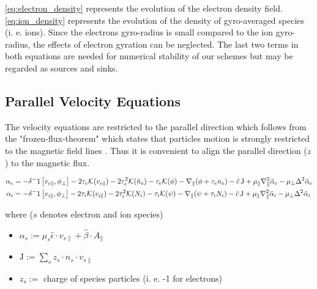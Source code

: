 \newline
\autoref{eq:electron_density} represents the evolution of the electron density field.
\autoref{eq:ion_density} represents the evolution of the density of gyro-averaged species (i. e. ions). Since the electrons gyro-radius is small compared to the ion gyro-radius, the effects of electron gyration can be neglected. \newline
The last two terms in both equations are needed for numerical stability of our schemes but may be regarded as sources and sinks. 


\subsection{Parallel Velocity Equations}
The velocity equations are restricted to the parallel direction which follows from the "frozen-flux-theorem" which states that particles motion is strongly restricted to the magnetic field lines . Thus it is convenient to align the parallel direction ($z$) to the magnetic flux.


\begin{align}
    \alpha_e &=  -\delta^-1 \left[v_{e\parallel}, \phi_\perp\right]
    - 2\tau_e \mathcal{K}( v_{e\parallel})
    - 2\tau_e^2 \mathcal{K}(\Tilde{n}_e)
    - \tau_e \mathcal{K}( \phi)
    - \nabla_\parallel (\phi + \tau_e n_e)
    - \hat{c}\, \mathrm{J}
    + \mu_\parallel \nabla_\parallel^2\Tilde{\alpha}_e 
    - \mu_\perp \Delta^2\Tilde{\alpha}_e \label{eq:electron_velocity} \\
    \alpha_i &= -\delta^-1  \left[v_{i\parallel}, \phi_\perp\right]
    - 2\tau_i \mathcal{K}(v_{i\parallel})
    - 2\tau_i^2 \mathcal{K}(N_i)
    - \tau_i \mathcal{K}(\psi)
    - \nabla_\parallel (\psi + \tau_i N_i)
    - \hat{c}\, \mathrm{J}
    + \mu_\parallel\nabla_\parallel^2\Tilde{\alpha}_i 
    - \mu_\perp \Delta^2\Tilde{\alpha}_i \label{eq:ion_velocity}
\end{align}

where ($s$ denotes electron and ion species)

\begin{itemize}
    \item $\alpha_s := \mu_s \hat{\epsilon} \cdot v_{s\parallel} + \hat{\beta} \cdot A_{\parallel}$
    \item $\mathrm{J} := \sum_s z_s \cdot n_s \cdot v_{s\parallel}$
    \item $z_s :=$ charge of species particles (i. e. -1 for electrons)
\end{itemize}

